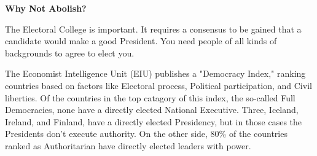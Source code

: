 \documentclass{article}
\begin{document}
    \textbf{Why Not Abolish?}

    The Electoral College is important. It requires a consensus to be gained that a candidate would make a good President. You need people of all kinds 
    of backgrounds to agree to elect you.

    The Economist Intelligence Unit (EIU) publishes a "Democracy Index," ranking countries based on factors like Electoral process, Political 
    participation, and Civil liberties. Of the countries in the top catagory of this index, the so-called Full Democracies, none have a directly elected 
    National Executive. Three, Iceland, Ireland, and Finland, have a directly elected Presidency, but in those cases the Presidents don't execute 
    authority. On the other side, 80\% of the countries ranked as Authoritarian have directly elected leaders with power.
\end{document}
